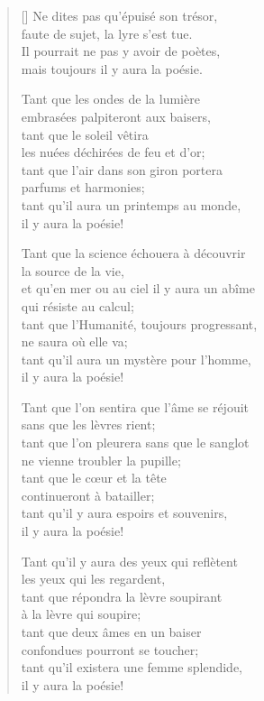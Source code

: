 \documentclass[a4paper,12pt]{book}
\begin{document}
\begin{verse}[\versewidth]
  Ne dites pas qu'épuisé son trésor, \\
  faute de sujet, la lyre s'est tue. \\
  Il pourrait ne pas y avoir de poètes, \\
  mais toujours il y aura la poésie.

  Tant que les ondes de la lumière \\
  embrasées palpiteront aux baisers, \\
  tant que le soleil vêtira \\
  les nuées déchirées de feu et d'or; \\
  tant que l'air dans son giron portera \\
  parfums et harmonies; \\
  tant qu'il aura un printemps au monde, \\
  il y aura la poésie!

  Tant que la science échouera à découvrir \\
  la source de la vie, \\
  et qu'en mer ou au ciel il y aura un abîme \\
  qui résiste au calcul; \\
  tant que l'Humanité, toujours progressant, \\
  ne saura où elle va; \\
  tant qu'il aura un mystère pour l'homme, \\
  il y aura la poésie!

  Tant que l'on sentira que l'âme se réjouit \\
  sans que les lèvres rient; \\
  tant que l'on pleurera sans que le sanglot \\
  ne vienne troubler la pupille; \\
  tant que le c{\oe}ur et la tête \\
  continueront à batailler; \\
  tant qu'il y aura espoirs et souvenirs, \\
  il y aura la poésie!

  Tant qu'il y aura des yeux qui reflètent \\
  les yeux qui les regardent, \\
  tant que répondra la lèvre soupirant \\
  à la lèvre qui soupire; \\
  tant que deux âmes en un baiser \\
  confondues pourront se toucher; \\
  tant qu'il existera une femme splendide, \\
  il y aura la poésie!
\end{verse}
\end{document}
